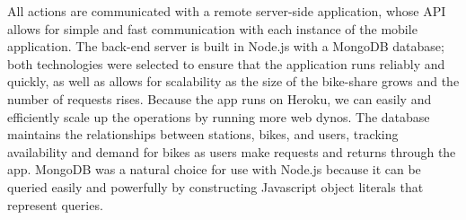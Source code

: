 \documentclass{sig-alternate}
\begin{document}
All actions are communicated with a remote server-side application, whose API allows for simple and fast communication with each instance of the mobile application. The back-end server is built in Node.js with a MongoDB database; both technologies were selected to ensure that the application runs reliably and quickly, as well as allows for scalability as the size of the bike-share grows and the number of requests rises. Because the app runs on Heroku, we can easily and efficiently scale up the operations by running more web dynos.  The database maintains the relationships between stations, bikes, and users, tracking availability and demand for bikes as users make requests and returns through the app. MongoDB was a natural choice for use with Node.js because it can be queried easily and powerfully by constructing Javascript object literals that represent queries.  \newline
\end{document}
